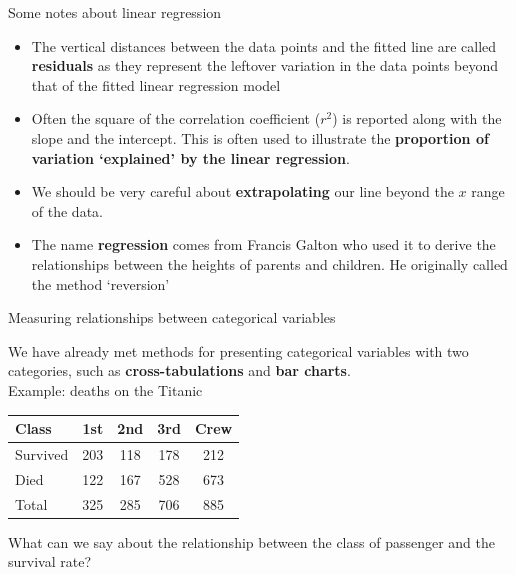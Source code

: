 \documentclass[12pt,xcolor=dvipsnames,handout,mathserif,aspectratio=169]{beamer}
\newcommand{\bbl}[1]{{\color{NavyBlue} \textbf{#1}}}
\newcommand{\bre}[1]{{\color{red} \textbf{#1}}}
\newcommand{\bgr}[1]{{\color{PineGreen} \textbf{#1}}}
\begin{document}
\begin{frame}{Some notes about linear regression}

\begin{itemize}
\item The vertical distances between the data points and the fitted line are called \bre{residuals} as they represent the leftover variation in the data points beyond that of the fitted linear regression model
\pause
\item Often the square of the correlation coefficient ($r^2$) is reported along with the slope and the intercept. This is often used to illustrate the \bbl{proportion of variation `explained' by the linear regression}. 
\pause
\item We should be very careful about \bre{extrapolating} our line beyond the $x$ range of the data. 
\pause
\item The name \bgr{regression} comes from Francis Galton who used it to derive the relationships between the heights of parents and children. He originally called the method `reversion'
\end{itemize}
\end{frame}


\begin{frame}{Measuring relationships between categorical variables}

We have already met methods for presenting categorical variables with two categories, such as \bgr{cross-tabulations} and \bbl{bar charts}.\\
\vspace{0.2cm}
Example: deaths on the Titanic
\begin{center}
\begin{tabular}{l|cccc}
\hline
Class & 1st & 2nd & 3rd & Crew \\
\hline
Survived & 203 & 118 & 178 & 212 \\
Died & 122 & 167 & 528 & 673 \\
\hline
Total & 325 & 285 & 706 & 885 \\
\hline
\end{tabular}
\end{center}
What can we say about the relationship between the class of passenger and the survival rate?
\end{frame}
\end{document}

